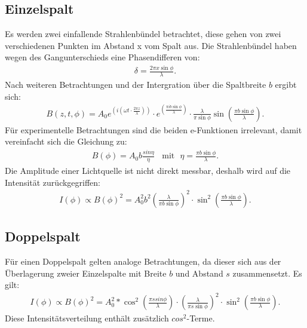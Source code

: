 \subsection{Einzelspalt}
Es werden zwei einfallende Strahlenbündel betrachtet, diese gehen von zwei verschiedenen Punkten im Abstand x vom
Spalt aus. Die Strahlenbündel haben wegen des Gangunterschieds eine Phasendifferen von:
\begin{align}
\delta = \frac{2\pi x \sin\phi}{\lambda}.
\end{align}
Nach weiteren Betrachtungen und der Intergration über die Spaltbreite $b$ ergibt sich:
\begin{align}
B(z,t,\phi)=A_0 e^{\left(i\left(\omega t\cdot\frac{2\pi z}{\lambda}\right)\right)}\cdot e^{\left(\frac{\pi i b\sin\phi}{\lambda}\right)}\cdot\frac{\lambda}{\pi\sin\phi}\sin\left(\frac{\pi b \sin\phi}{\lambda}\right).
\end{align}
Für experimentelle Betrachtungen sind die beiden e-Funktionen irrelevant, damit vereinfacht sich die Gleichung zu:
\begin{align}
B(\phi)=A_0 b \frac{sin \eta}{\eta} \ \ \ \ \text{mit} \ \ \ \eta=\frac{\pi b \sin \phi}{\lambda}.
\end{align}
Die Amplitude einer Lichtquelle ist nicht direkt messbar, deshalb wird auf die Intensität zurückgegriffen:
\begin{align}
I(\phi)\propto B(\phi)^2 = A_0^2 b^2\left(\frac{\lambda}{\pi b \sin\phi}\right)^2\cdot\sin^2\left(\frac{\pi b \sin\phi}{\lambda}\right).\label{eqn:einzel}
\end{align}
\subsection{Doppelspalt}
Für einen Doppelspalt gelten analoge Betrachtungen, da dieser sich aus der Überlagerung zweier Einzelspalte
mit Breite $b$ und Abstand $s$ zusammensetzt. Es gilt:
\begin{align}
I(\phi) \propto B(\phi)^2 = A_0^2*\cos^2\left(\frac{\pi s sin\phi}{\lambda}\right)\cdot\left(\frac{\lambda}{\pi s \sin\phi}\right)^2\cdot\sin^2\left(\frac{\pi b \sin\phi}{\lambda}\right).\label{eqn:dopp}
\end{align}
Diese Intensitätsverteilung enthält zusätzlich $cos^2$-Terme.
